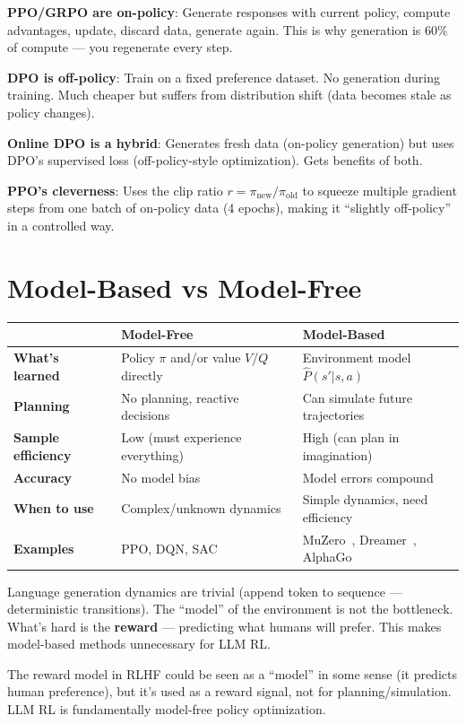 \begin{intuitionbox}
\textbf{PPO/GRPO are on-policy}: Generate responses with current policy, compute advantages, update, discard data, generate again. This is why generation is 60\% of compute --- you regenerate every step.

\textbf{DPO is off-policy}: Train on a fixed preference dataset. No generation during training. Much cheaper but suffers from distribution shift (data becomes stale as policy changes).

\textbf{Online DPO is a hybrid}: Generates fresh data (on-policy generation) but uses DPO’s supervised loss (off-policy-style optimization). Gets benefits of both.

\textbf{PPO’s cleverness}: Uses the clip ratio $r = \pi_\text{new}/\pi_\text{old}$ to squeeze multiple gradient steps from one batch of on-policy data (4 epochs), making it ``slightly off-policy'' in a controlled way.
\end{intuitionbox}

\section{Model-Based vs Model-Free}
\label{model-based-vs-model-free}

\begin{tabular}{@{}lp{5cm}p{8cm}@{}}
\toprule
 & \textbf{Model-Free} & \textbf{Model-Based} \\
\midrule
\textbf{What’s learned} & Policy $\pi$ and/or value $V$/$Q$ directly & Environment model $\hat{P}(s'|s,a)$ \\
\textbf{Planning} & No planning, reactive decisions & Can simulate future trajectories \\
\textbf{Sample efficiency} & Low (must experience everything) & High (can plan in imagination) \\
\textbf{Accuracy} & No model bias & Model errors compound \\
\textbf{When to use} & Complex/unknown dynamics & Simple dynamics, need efficiency \\
\textbf{Examples} & PPO, DQN, SAC~\cite{haarnoja2018soft} & MuZero~\cite{schrittwieser2020mastering}, Dreamer~\cite{hafner2020dream}, AlphaGo~\cite{silver2016mastering} \\
\bottomrule
\end{tabular}

\begin{intuitionbox}
Language generation dynamics are trivial (append token to sequence --- deterministic transitions). The ``model'' of the environment is not the bottleneck. What’s hard is the \textbf{reward} --- predicting what humans will prefer. This makes model-based methods unnecessary for LLM RL.

The reward model in RLHF could be seen as a ``model'' in some sense (it predicts human preference), but it’s used as a reward signal, not for planning/simulation. LLM RL is fundamentally model-free policy optimization.
\end{intuitionbox}

